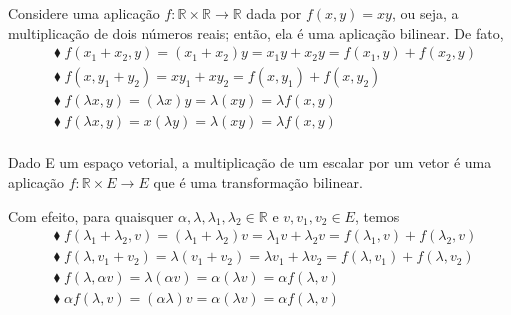 \documentclass[../differential_forms.tex]{subfiles}
\begin{document}
\begin{example}
	Considere uma aplicação \(f:\mathbb{R}\times \mathbb{R}\rightarrow \mathbb{R}\) dada por \(f(x, y) = xy\), ou seja, a multiplicação de dois números reais; então, ela é uma aplicação bilinear. De fato,
	\begin{align*}
		 & \blacklozenge\; f(x_1+x_2, y) = (x_1+x_2)y = x_1 y +x_2 y = f(x_1, y) + f(x_2, y) \\
		 & \blacklozenge\; f(x, y_1+y_2) = xy_1 + xy_2 = f(x, y_1)+f(x, y_2)                 \\
		 & \blacklozenge\; f(\lambda x, y) = (\lambda x)y = \lambda (xy) = \lambda f(x, y)   \\
		 & \blacklozenge\; f(\lambda x, y) = x(\lambda y) = \lambda (xy) = \lambda f(x, y)   \\
	\end{align*}
\end{example}
\begin{example}
	Dado E um espaço vetorial, a multiplicação de um escalar por um vetor é uma aplicação \(f:\mathbb{R}\times E\rightarrow E\) que é uma transformação bilinear.

	Com efeito, para quaisquer \(\alpha , \lambda , \lambda_1,\lambda_2\in \mathbb{R}\) e \(v, v_1, v_2\in E\), temos
	\begin{align*}
		 & \blacklozenge\; f(\lambda_1+\lambda_2, v) = (\lambda_1+\lambda_2)v = \lambda_1 v + \lambda_2 v = f(\lambda_1, v)+f(\lambda_2, v) \\
		 & \blacklozenge\; f(\lambda, v_1+v_2) = \lambda(v_1+v_2) = \lambda v_1 + \lambda v_2 = f(\lambda, v_1)+f(\lambda, v_2)             \\
		 & \blacklozenge\; f(\lambda, \alpha v) = \lambda (\alpha v) = \alpha (\lambda v)= \alpha f(\lambda, v)                             \\
		 & \blacklozenge\; \alpha f(\lambda, v) = (\alpha \lambda) v = \alpha (\lambda v)= \alpha f(\lambda, v)                             \\
	\end{align*}
\end{example}
\end{document}
